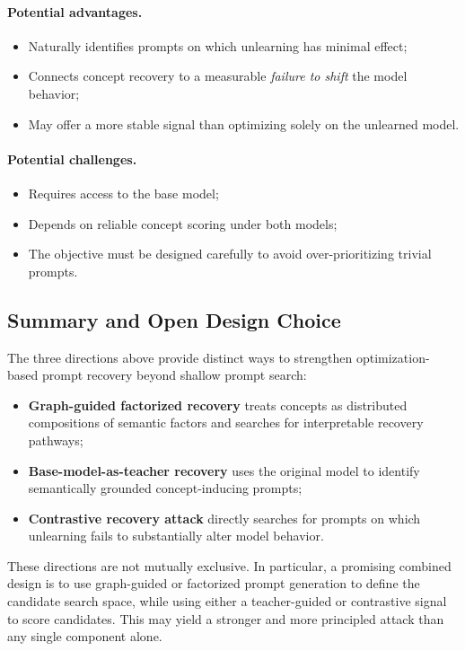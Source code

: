 \paragraph{Potential advantages.}
\begin{itemize}
    \item Naturally identifies prompts on which unlearning has minimal effect;
    \item Connects concept recovery to a measurable \emph{failure to shift} the model behavior;
    \item May offer a more stable signal than optimizing solely on the unlearned model.
\end{itemize}

\paragraph{Potential challenges.}
\begin{itemize}
    \item Requires access to the base model;
    \item Depends on reliable concept scoring under both models;
    \item The objective must be designed carefully to avoid over-prioritizing trivial prompts.
\end{itemize}

\subsection{Summary and Open Design Choice}
\label{subsec:summary_open_choice}

The three directions above provide distinct ways to strengthen optimization-based prompt recovery beyond shallow prompt search:

\begin{itemize}
    \item \textbf{Graph-guided factorized recovery} treats concepts as distributed compositions of semantic factors and searches for interpretable recovery pathways;
    \item \textbf{Base-model-as-teacher recovery} uses the original model to identify semantically grounded concept-inducing prompts;
    \item \textbf{Contrastive recovery attack} directly searches for prompts on which unlearning fails to substantially alter model behavior.
\end{itemize}

These directions are not mutually exclusive. In particular, a promising combined design is to use graph-guided or factorized prompt generation to define the candidate search space, while using either a teacher-guided or contrastive signal to score candidates. This may yield a stronger and more principled attack than any single component alone.